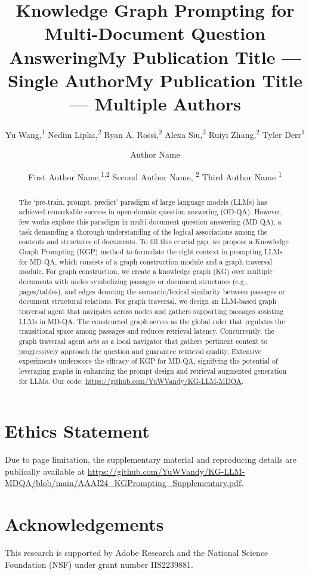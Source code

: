 \documentclass[letterpaper]{article} %
\title{Knowledge Graph Prompting for Multi-Document Question Answering}
\author {
    Yu Wang,\textsuperscript{\rm 1}
    Nedim Lipka,\textsuperscript{\rm 2}
    Ryan A. Rossi,\textsuperscript{\rm 2}
    Alexa Siu,\textsuperscript{\rm 2}
    Ruiyi Zhang,\textsuperscript{\rm 2}
    Tyler Derr\textsuperscript{\rm 1}
}
\title{My Publication Title --- Single Author}
\author {
    Author Name
}
\title{My Publication Title --- Multiple Authors}
\author {
    First Author Name,\textsuperscript{\rm 1,\rm 2}
    Second Author Name, \textsuperscript{\rm 2}
    Third Author Name \textsuperscript{\rm 1}
}
\begin{document}
\maketitle

\begin{abstract}
The `pre-train, prompt, predict' paradigm of large language models (LLMs) has achieved remarkable success in open-domain question answering (OD-QA). However, few works explore this paradigm in multi-document question answering (MD-QA), a task demanding a thorough understanding of the logical associations among the contents and structures of documents. To fill this crucial gap, we propose a Knowledge Graph Prompting (KGP) method to formulate the right context in prompting LLMs for MD-QA, which consists of a graph construction module and a graph traversal module. For graph construction, we create a knowledge graph (KG) over multiple documents with nodes symbolizing passages or document structures (e.g., pages/tables), and edges denoting the semantic/lexical similarity between passages or document structural relations. For graph traversal, we design an LLM-based graph traversal agent that navigates across nodes and gathers supporting passages assisting LLMs in MD-QA. The constructed graph serves as the global ruler that regulates the transitional space among passages and reduces retrieval latency. Concurrently, the graph traversal agent acts as a local navigator that gathers pertinent context to progressively approach the question and guarantee retrieval quality. Extensive experiments underscore the efficacy of KGP for MD-QA, signifying the potential of leveraging graphs in enhancing the prompt design and retrieval augmented generation for LLMs. Our code: \url{https://github.com/YuWVandy/KG-LLM-MDQA}.
\end{abstract}











\section*{Ethics Statement}
Due to page limitation, the supplementary material and reproducing details are publically available at \url{https://github.com/YuWVandy/KG-LLM-MDQA/blob/main/AAAI24_KGPrompting_Supplementary.pdf}.

\section*{Acknowledgements}
This research is supported by Adobe Research and the National Science Foundation (NSF) under grant number IIS2239881. 




\end{document}

